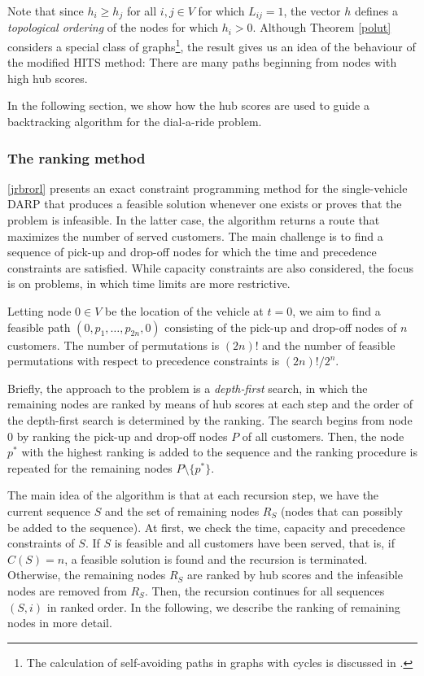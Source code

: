 \documentclass[dissertation,draft*]{aaltoseries}
\begin{document}
Note that since $h_i \geq h_j$ for all $i,j \in V$ for which $L_{ij} = 1$, the vector $h$ defines a \emph{topological
ordering} \cite{cormen} of the nodes for which $h_i > 0$.
Although Theorem \ref{polut} considers a special class of 
graphs\footnote{The calculation of self-avoiding paths in graphs with cycles is discussed in \cite{ponstein}.}, 
the result gives us an idea of the behaviour of the modified HITS method: There are many paths beginning from 
nodes with high hub scores. 

In the following section, we show how the 
hub scores are used to guide 
a backtracking algorithm for the dial-a-ride problem.

\subsubsection{The ranking method}
\label{svsolution}
\ref{jrbrorl} presents an exact constraint programming method for the single-vehicle DARP that 
produces a feasible solution whenever one exists or proves that the problem is infeasible.
In the latter case, the algorithm returns a route that maximizes the number of served customers.
The main challenge is to find a sequence of pick-up and drop-off nodes for which 
the time and precedence constraints are satisfied. While capacity constraints are 
also considered, the focus is on problems, in which time limits are more restrictive.

Letting node $0 \in V$ be the location of the vehicle at $t=0$,
we aim to find a feasible path $(0,p_1,\ldots,p_{2n},0)$
consisting of the pick-up and drop-off nodes of $n$ customers.
The number of permutations is $(2n)!$ and the number of feasible permutations
with respect to precedence constraints is $(2n)!/2^n$.

Briefly, the approach to the problem is a \emph{depth-first} search, in which the
remaining nodes are ranked by means of hub scores at each step and the order of the depth-first search is determined by the 
ranking. %
The search begins from node $0$ by ranking the pick-up and drop-off nodes $P$ of all customers.
Then, the node $p^{*}$ with the highest ranking is added to the sequence and the ranking procedure is
repeated for the remaining nodes $P \setminus \{p^{*}\}$.

The main idea of the algorithm is that at each recursion step, we have the current sequence $S$ 
and the set of remaining nodes $R_S$ (nodes that can possibly be added to the sequence). 
At first, we check the time, capacity and precedence constraints of $S$.
If $S$ is feasible and all customers have been served, that is, if $C(S) = n$, a feasible solution is found and 
the recursion is terminated.
Otherwise,
the remaining nodes $R_S$ are ranked by hub scores and the infeasible nodes 
are removed from $R_S$.
Then, the recursion continues for all sequences $(S,i)$ in ranked order.
In the following, we describe the ranking of remaining nodes in more detail.
\end{document}
